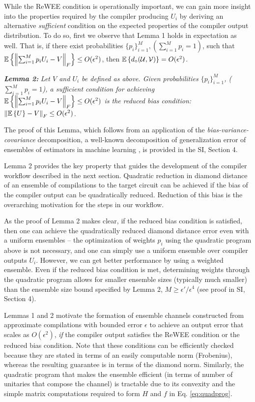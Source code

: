 While the ReWEE condition is operationally important, we can gain more insight into the properties required by the compiler producing $U_i$ by deriving an alternative \emph{sufficient} condition on the expected properties of the compiler output distribution. To do so, first we observe that Lemma 1 holds in expectation as well. That is, if there exist probabilities $\{p_i\}_{i=1}^M, (\sum_{i=1}^M p_i=1)$, such that $\mathbb{E}\left\{ \left\lVert \sum_{i=1}^M p_i U_i - V \right\rVert_F \right\} \leq O(\epsilon^2)$, then $\mathbb{E}\left\{ d_{\diamond}(\mathcal{U}, \mathcal{V}) \right\} = O(\epsilon^2)$.

\noindent \emph{\bf Lemma 2:} \emph{Let $V$ and $U_i$ be defined as above. Given probabilities $\{p_i\}_{i=1}^M$, ($\sum_{i=1}^M p_i=1$), a sufficient condition for achieving $\mathbb{E}\left\{ \left\lVert \sum_{i=1}^M p_i U_i - V \right\rVert_F \right\} \leq O(\epsilon^2)$ is the \emph{reduced bias condition}: $\left\lVert \mathbb{E}\left\{ U \right\}-V \right\rVert_F \leq O(\epsilon^2)$.}

The proof of this Lemma, which follows from an application of the \emph{bias-variance-covariance} decomposition, a well-known decomposition of generalization error of ensembles of estimators in machine learning \cite{Ueda_1996, Brown_20005}, is provided in the SI, Section 4.

Lemma 2 provides the key property that guides the development of the compiler workflow described in the next section.  Quadratic reduction in diamond distance of an ensemble of compilations to the target circuit can be achieved if the bias of the compiler output can be quadratically reduced. Reduction of this bias is the overarching motivation for the steps in our workflow.

As the proof of Lemma 2 makes clear, if the reduced bias condition is satisfied, then one can achieve the quadratically reduced diamond distance error even with a uniform ensembles -- \ie the optimization of weights $p_i$ using the quadratic program above is not necessary, and one can simply use a uniform ensemble over compiler outputs $U_i$. However, we can get better performance by using a weighted ensemble. Even if the reduced bias condition is met, determining weights through the quadratic program allows for smaller ensemble sizes (typically much smaller) than the ensemble size bound specified by Lemma 2, $M \geq \epsilon'/\epsilon^4$ (see proof in SI, Section 4). 


Lemmas 1 and 2 motivate the formation of ensemble channels constructed from approximate compilations with bounded error $\epsilon$ to achieve an output error that scales as $O(\epsilon^2)$, \emph{if} the compiler output satisfies the ReWEE condition or the reduced bias condition. Note that these conditions can be efficiently checked because they are stated in terms of an easily computable norm (Frobenius), whereas the resulting guarantee is in terms of the diamond norm. Similarly, the quadratic program that makes the ensemble efficient (in terms of number of unitaries that compose the channel) is tractable due to its convexity and the simple matrix computations required to form $H$ and $f$ in Eq. \eqref{eq:quadprog}.

